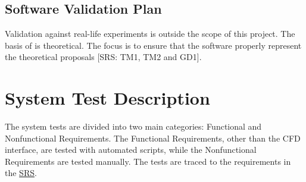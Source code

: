 \documentclass[12pt, titlepage]{article}
\begin{document}


\subsection{Software Validation Plan}

Validation against real-life experiments is outside the scope of this project. The basis of \progname{} is theoretical. The focus is to ensure that the software properly represent the theoretical proposals [SRS: TM1, TM2 and GD1].






\newpage
\section{System Test Description}

The system tests are divided into two main categories: Functional and Nonfunctional Requirements. The Functional Requirements, other than the CFD interface, are tested with automated scripts, while the Nonfunctional Requirements are tested manually. The tests are traced to the requirements in the \href{https://github.com/omltcat/turbulent-flow/blob/main/docs/SRS/SRS.pdf}{SRS}.
	
\end{document}
